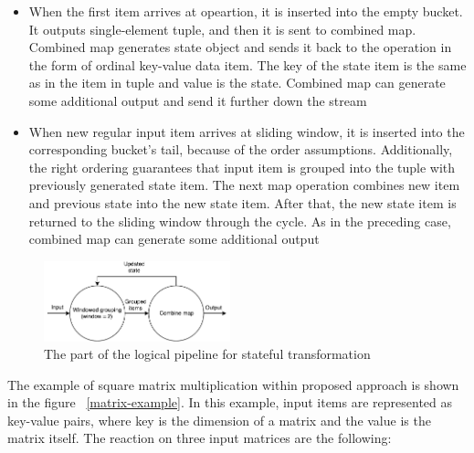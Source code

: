 \begin{itemize}
    \item When the first item arrives at opeartion, it is inserted into the empty bucket. It outputs single-element tuple, and then it is sent to combined map. Combined map generates state object and sends it back to the operation in the form of ordinal key-value data item. The key of the state item is the same as in the item in tuple and value is the state. Combined map can generate some additional output and send it further down the stream
    \item When new regular input item arrives at sliding window, it is inserted into the corresponding bucket's tail, because of the order assumptions. Additionally, the right ordering guarantees that input item is grouped into the tuple with previously generated state item. The next map operation combines new item and previous state into the new state item. After that, the new state item is returned to the sliding window through the cycle. As in the preceding case, combined map can generate some additional output
\end{itemize}

\begin{figure}[htbp]
  \centering
  \includegraphics[width=0.48\textwidth]{pics/stateful-schema}
  \caption{The part of the logical pipeline for stateful transformation}
  \label {stateful-schema}
\end{figure}

The example of square matrix multiplication within proposed approach is shown in the figure ~\ref{matrix-example}. In this example, input items are represented as key-value pairs, where key is the dimension of a matrix and the value is the matrix itself. The reaction on three input matrices are the following:

